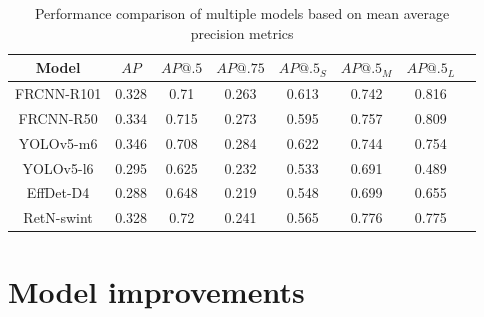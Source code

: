 \begin{table}[H]
    \begin{tabular}{|c|c|c|c|c|c|c|c|}
        \hline
        Model      & $AP$  & $AP@.5$ & $AP@.75$ & $AP@.5_S$ & $AP@.5_M$ & $AP@.5_L$ \\ \hline
        FRCNN-R101 & 0.328 & 0.71    & 0.263    & 0.613     & 0.742     & 0.816     \\ \hline
        FRCNN-R50  & 0.334 & 0.715   & 0.273    & 0.595     & 0.757     & 0.809     \\ \hline
        YOLOv5-m6  & 0.346 & 0.708   & 0.284    & 0.622     & 0.744     & 0.754     \\ \hline
        YOLOv5-l6  & 0.295 & 0.625   & 0.232    & 0.533     & 0.691     & 0.489     \\ \hline
        EffDet-D4  & 0.288 & 0.648   & 0.219    & 0.548     & 0.699     & 0.655     \\ \hline
        RetN-swint & 0.328 & 0.72    & 0.241    & 0.565     & 0.776     & 0.775     \\ \hline
    \end{tabular}
    \caption{Performance comparison of multiple models based on mean average precision metrics}
    \label{tab:model_results:stage_five}
\end{table}

\section{Model improvements}
\label{sec:model_improvements_results}
